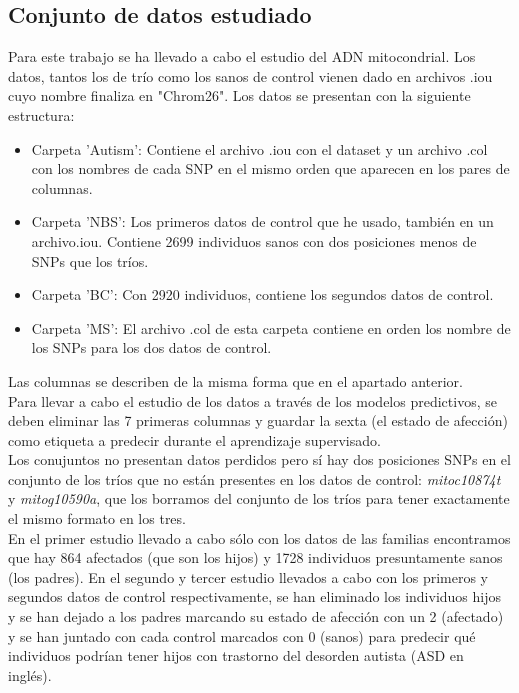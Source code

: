 \subsection{Conjunto de datos estudiado}
Para este trabajo se ha llevado a cabo el estudio del ADN mitocondrial. Los datos, tantos los de trío como los sanos de control vienen dado en archivos .iou cuyo nombre finaliza en "Chrom26". Los datos se presentan con la siguiente estructura:\\
\begin{itemize}
  \item Carpeta 'Autism': Contiene el archivo .iou con el dataset y un archivo .col con los nombres de cada SNP en el mismo orden que aparecen en los pares de columnas.
  \item Carpeta 'NBS': Los primeros datos de control que he usado, también en un archivo.iou. Contiene 2699 individuos sanos con dos posiciones menos de SNPs que los tríos.
  \item Carpeta 'BC': Con 2920 individuos, contiene los segundos datos de control.
  \item Carpeta 'MS': El archivo .col de esta carpeta contiene en orden los nombre de los SNPs para los dos datos de control.
\end{itemize}
Las columnas se describen de la misma forma que en el apartado anterior.\\
Para llevar a cabo el estudio de los datos a través de los modelos predictivos, se deben eliminar las 7 primeras columnas y guardar la sexta (el estado de afección) como etiqueta a predecir durante el aprendizaje supervisado.\\
Los conujuntos no presentan datos perdidos pero sí hay dos posiciones SNPs en el conjunto de los tríos que no están presentes en los datos de control: \textit{mitoc10874t} y \textit{mitog10590a}, que los borramos del conjunto de los tríos para tener exactamente el mismo formato en los tres.\\
En el primer estudio llevado a cabo sólo con los datos de las familias encontramos que hay 864 afectados (que son los hijos) y 1728 individuos presuntamente sanos (los padres). En el segundo y tercer estudio llevados a cabo con los primeros y segundos datos de control respectivamente, se han eliminado los individuos hijos y se han dejado a los padres marcando su estado de afección con un 2 (afectado) y se han juntado con cada control marcados con 0 (sanos) para predecir qué individuos podrían tener hijos con trastorno del desorden autista (ASD en inglés).
\endinput

%
%
%
%
%
%
%
%
%
%
%
%
%
%
%
%







